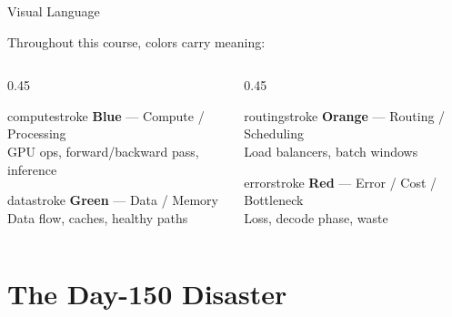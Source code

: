 \documentclass[aspectratio=169, 12pt]{beamer}
\begin{document}
\begin{frame}{Visual Language}
\note{
%
}

\small
Throughout this course, colors carry meaning:

\vspace{0.3cm}
\begin{columns}[T]
  \begin{column}{0.45\textwidth}
    \begin{mlsyscard}{computestroke}
    \textbf{Blue} --- Compute / Processing\\
    {\footnotesize GPU ops, forward/backward pass, inference}
    \end{mlsyscard}
    \vspace{0.15cm}
    \begin{mlsyscard}{datastroke}
    \textbf{Green} --- Data / Memory\\
    {\footnotesize Data flow, caches, healthy paths}
    \end{mlsyscard}
  \end{column}
  \begin{column}{0.45\textwidth}
    \begin{mlsyscard}{routingstroke}
    \textbf{Orange} --- Routing / Scheduling\\
    {\footnotesize Load balancers, batch windows}
    \end{mlsyscard}
    \vspace{0.15cm}
    \begin{mlsyscard}{errorstroke}
    \textbf{Red} --- Error / Cost / Bottleneck\\
    {\footnotesize Loss, decode phase, waste}
    \end{mlsyscard}
  \end{column}
\end{columns}
\end{frame}


\section{The Day-150 Disaster}
\end{document}

